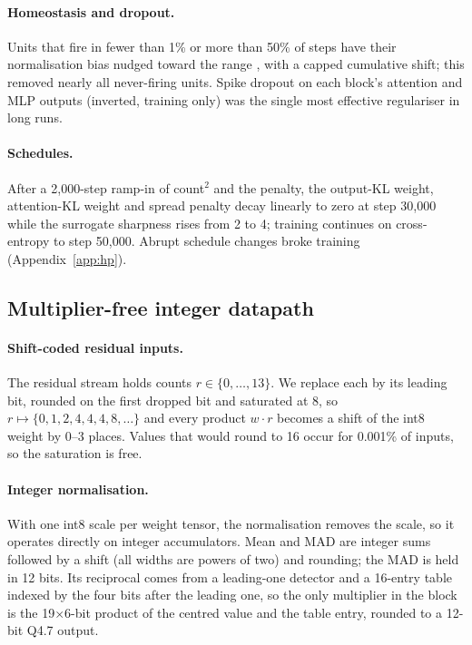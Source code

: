 \documentclass[10pt]{article}
\newcommand{\csq}{count$^2$}
\begin{document}
\paragraph{Homeostasis and dropout.} Units that fire in fewer than 1\% or more than 50\% of steps have their
normalisation bias nudged toward the range \citep{turrigiano2004homeostatic}, with a capped cumulative shift; this
removed nearly all never-firing units. Spike dropout \citep{srivastava2014dropout} on each block's attention and
MLP outputs (inverted, training only) was the single most effective regulariser in long runs.

\paragraph{Schedules.} After a 2{,}000-step ramp-in of \csq{} and the penalty, the output-KL weight, attention-KL
weight and spread penalty decay linearly to zero at step 30{,}000 while the surrogate sharpness rises from 2 to 4;
training continues on cross-entropy to step 50{,}000. Abrupt schedule changes broke training (Appendix~\ref{app:hp}).

\subsection{Multiplier-free integer datapath}
\label{sec:datapath}

\paragraph{Shift-coded residual inputs.} The residual stream holds counts $r \in \{0, \dots, 13\}$. We replace
each by its leading bit, rounded on the first dropped bit and saturated at 8, so $r \mapsto \{0,1,2,4,4,4,8,\dots\}$
and every product $w \cdot r$ becomes a shift of the int8 weight by 0--3 places. Values that would round to 16 occur
for 0.001\% of inputs, so the saturation is free.

\paragraph{Integer normalisation.} With one int8 scale per weight tensor, the normalisation removes the scale, so
it operates directly on integer accumulators. Mean and MAD are integer sums followed by a shift (all widths are
powers of two) and rounding; the MAD is held in 12 bits. Its reciprocal comes from a leading-one detector and a
16-entry table indexed by the four bits after the leading one, so the only multiplier in the block is the
19$\times$6-bit product of the centred value and the table entry, rounded to a 12-bit Q4.7 output.
\end{document}
